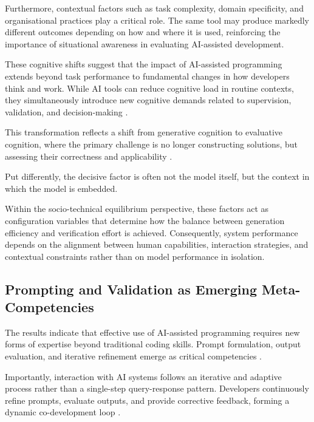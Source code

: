 \documentclass[conference]{IEEEtran}
\begin{document}
Furthermore, contextual factors such as task complexity, domain specificity, and organisational practices play a critical role. The same tool may produce markedly different outcomes depending on how and where it is used, reinforcing the importance of situational awareness in evaluating AI-assisted development.

These cognitive shifts suggest that the impact of AI-assisted programming extends beyond task performance to fundamental changes in how developers think and work. While AI tools can reduce cognitive load in routine contexts, they simultaneously introduce new cognitive demands related to supervision, validation, and decision-making \cite{tang_study_2024}.

This transformation reflects a shift from generative cognition to evaluative cognition, where the primary challenge is no longer constructing solutions, but assessing their correctness and applicability \cite{tang_study_2024, gardella_performance_2024}.

Put differently, the decisive factor is often not the model itself, but the context in which the model is embedded.

Within the socio-technical equilibrium perspective, these factors act as configuration variables that determine how the balance between generation efficiency and verification effort is achieved. Consequently, system performance depends on the alignment between human capabilities, interaction strategies, and contextual constraints rather than on model performance in isolation.

\subsection{Prompting and Validation as Emerging Meta-Competencies}

The results indicate that effective use of AI-assisted programming requires new forms of expertise beyond traditional coding skills. Prompt formulation, output evaluation, and iterative refinement emerge as critical competencies \cite{pinto_developer_2024, zhong_developer-llm_2025}.

Importantly, interaction with AI systems follows an iterative and adaptive process rather than a single-step query-response pattern. Developers continuously refine prompts, evaluate outputs, and provide corrective feedback, forming a dynamic co-development loop \cite{fayed_prompt-driven_2026, rahe_how_2025, khan_assessing_2023, pinto_developer_2024}.
\end{document}
